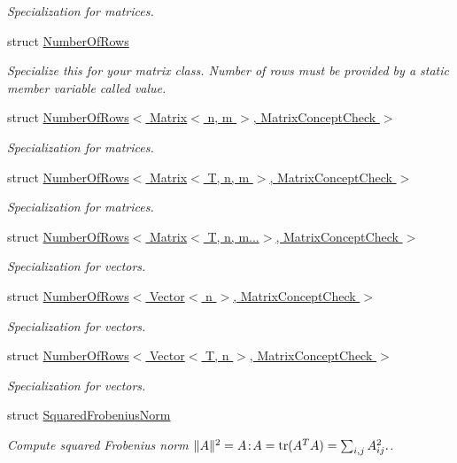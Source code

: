 \begin{DoxyCompactItemize}
\begin{DoxyCompactList}\small\item\em Specialization for matrices. \end{DoxyCompactList}\item 
struct \hyperlink{structFunG_1_1LinearAlgebra_1_1NumberOfRows}{Number\+Of\+Rows}
\begin{DoxyCompactList}\small\item\em Specialize this for your matrix class. Number of rows must be provided by a static member variable called value. \end{DoxyCompactList}\item 
struct \hyperlink{structFunG_1_1LinearAlgebra_1_1NumberOfRows_3_01Matrix_3_01n_00_01m_01_4_00_01MatrixConceptCheck_01_4}{Number\+Of\+Rows$<$ Matrix$<$ n, m $>$, Matrix\+Concept\+Check $>$}
\begin{DoxyCompactList}\small\item\em Specialization for matrices. \end{DoxyCompactList}\item 
struct \hyperlink{structFunG_1_1LinearAlgebra_1_1NumberOfRows_3_01Matrix_3_01T_00_01n_00_01m_01_4_00_01MatrixConceptCheck_01_4}{Number\+Of\+Rows$<$ Matrix$<$ T, n, m $>$, Matrix\+Concept\+Check $>$}
\begin{DoxyCompactList}\small\item\em Specialization for matrices. \end{DoxyCompactList}\item 
struct \hyperlink{structFunG_1_1LinearAlgebra_1_1NumberOfRows_3_01Matrix_3_01T_00_01n_00_01m_8_8_8_4_00_01MatrixConceptCheck_01_4}{Number\+Of\+Rows$<$ Matrix$<$ T, n, m...$>$, Matrix\+Concept\+Check $>$}
\begin{DoxyCompactList}\small\item\em Specialization for vectors. \end{DoxyCompactList}\item 
struct \hyperlink{structFunG_1_1LinearAlgebra_1_1NumberOfRows_3_01Vector_3_01n_01_4_00_01MatrixConceptCheck_01_4}{Number\+Of\+Rows$<$ Vector$<$ n $>$, Matrix\+Concept\+Check $>$}
\begin{DoxyCompactList}\small\item\em Specialization for vectors. \end{DoxyCompactList}\item 
struct \hyperlink{structFunG_1_1LinearAlgebra_1_1NumberOfRows_3_01Vector_3_01T_00_01n_01_4_00_01MatrixConceptCheck_01_4}{Number\+Of\+Rows$<$ Vector$<$ T, n $>$, Matrix\+Concept\+Check $>$}
\begin{DoxyCompactList}\small\item\em Specialization for vectors. \end{DoxyCompactList}\item 
struct \hyperlink{structFunG_1_1LinearAlgebra_1_1SquaredFrobeniusNorm}{Squared\+Frobenius\+Norm}
\begin{DoxyCompactList}\small\item\em Compute squared Frobenius norm $ \|A\|^2 = A\negthinspace : \negthinspace A = \mathrm{tr}(A^TA) = \sum_{i,j} A_{ij}^2. $. \end{DoxyCompactList}\end{DoxyCompactItemize}

